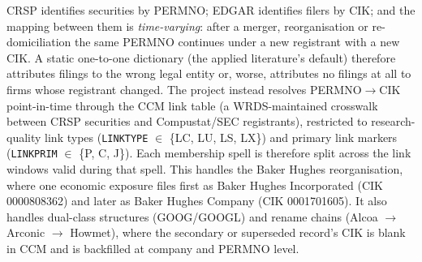 CRSP identifies securities by PERMNO; EDGAR identifies filers by CIK; and the mapping between them is \emph{time-varying}: after a merger, reorganisation or re-domiciliation the same PERMNO continues under a new registrant with a new CIK. A static one-to-one dictionary (the applied literature's default) therefore attributes filings to the wrong legal entity or, worse, attributes no filings at all to firms whose registrant changed. The project instead resolves PERMNO$\to$CIK point-in-time through the CCM link table (a WRDS-maintained crosswalk between CRSP securities and Compustat/SEC registrants), restricted to research-quality link types (\texttt{LINKTYPE} $\in$ \{LC, LU, LS, LX\}) and primary link markers (\texttt{LINKPRIM} $\in$ \{P, C, J\}). %
Each membership spell is therefore split across the link windows valid during that spell. This handles the Baker Hughes reorganisation, where one economic exposure files first as Baker Hughes Incorporated (CIK 0000808362) and later as Baker Hughes Company (CIK 0001701605). %
It also handles dual-class structures (GOOG/GOOGL) and rename chains (Alcoa $\to$ Arconic $\to$ Howmet), where the secondary or superseded record's CIK is blank in CCM and is backfilled at company and PERMNO level. %

